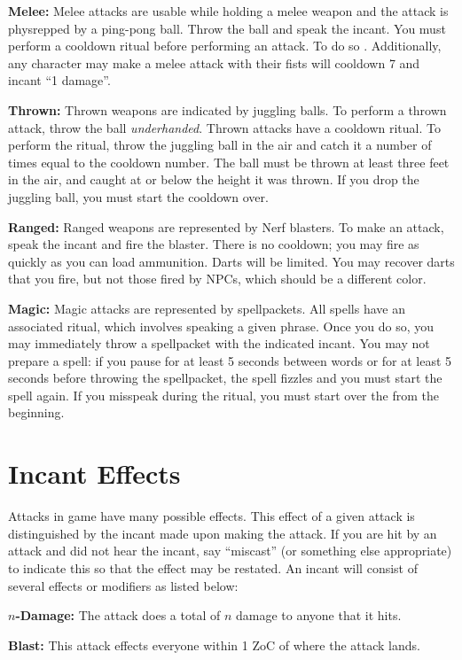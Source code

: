 \documentclass[green]{grimrock}
\begin{document}
{\bf Melee:} Melee attacks are usable while holding a melee weapon and the attack is physrepped by a ping-pong ball.  Throw the ball and speak the incant.  You must perform a cooldown ritual before performing an attack.  To do so . Additionally, any character may make a melee attack with their fists will cooldown 7 and incant ``1 damage''.

{\bf Thrown:}  Thrown weapons are indicated by juggling balls.  To perform a thrown attack, throw the ball \emph{underhanded}.  Thrown attacks have a cooldown ritual.  To perform the ritual, throw the juggling ball in the air and catch it a number of times equal to the cooldown number.  The ball must be thrown at least three feet in the air, and caught at or below the height it was thrown.  If you drop the juggling ball, you must start the cooldown over.

{\bf Ranged:} Ranged weapons are represented by Nerf blasters.  To make an attack, speak the incant and fire the blaster.  There is no cooldown; you may fire as quickly as you can load ammunition.  Darts will be limited.  You may recover darts that you fire, but not those fired by NPCs, which should be a different color.

{\bf Magic:}  Magic attacks are represented by spellpackets.  All spells have an associated ritual, which involves speaking a given phrase.  Once you do so, you may immediately throw a spellpacket with the indicated incant.  You may not prepare a spell: if you pause for at least 5 seconds between words or for at least 5 seconds before throwing the spellpacket, the spell fizzles and you must start the spell again.  If you misspeak during the ritual, you must start over the from the beginning.

\section{Incant Effects}

Attacks in game have many possible effects. This effect of a given attack is distinguished by the incant made upon making the attack. If you are hit by an attack and did not hear the incant, say ``miscast'' (or something else appropriate) to indicate this so that the effect may be restated. An incant will consist of several effects or modifiers as listed below:

{\bf $n$-Damage:} The attack does a total of $n$ damage to anyone that it hits.

{\bf Blast:} This attack effects everyone within 1 ZoC of where the attack lands.
\end{document}
